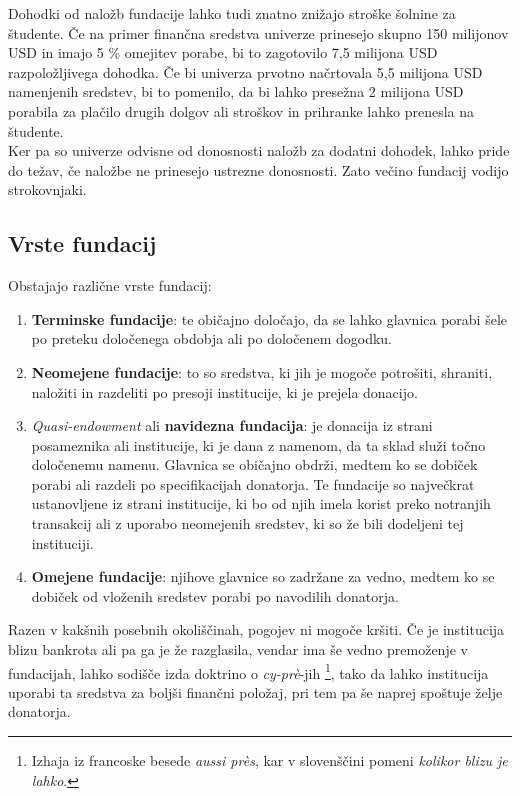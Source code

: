 \documentclass[12pt, a4paper]{article}
\begin{document}
Dohodki od naložb fundacije lahko tudi znatno znižajo stroške šolnine za študente. Če na primer finančna sredstva univerze prinesejo skupno 150 milijonov USD in imajo 5 \% omejitev porabe, bi to zagotovilo 7,5 milijona USD razpoložljivega dohodka. Če bi univerza prvotno načrtovala 5,5 milijona USD namenjenih sredstev, bi to pomenilo, da bi lahko presežna 2 milijona USD porabila za plačilo drugih dolgov ali stroškov in prihranke lahko prenesla na študente. \cite{Investopedia}\\

Ker pa so univerze odvisne od donosnosti naložb za dodatni dohodek, lahko pride do težav, če naložbe ne prinesejo ustrezne donosnosti. Zato večino fundacij vodijo strokovnjaki.\\


\subsection{Vrste fundacij}
Obstajajo različne vrste fundacij:
\begin{enumerate}
\item \textbf{Terminske fundacije}: te običajno določajo, da se lahko glavnica porabi šele po preteku določenega obdobja ali po določenem dogodku.
\item \textbf{Neomejene fundacije}: to so sredstva, ki jih je mogoče potrošiti, shraniti, naložiti in razdeliti po presoji institucije, ki je prejela donacijo.
\item \textit{Quasi-endowment} ali \textbf{navidezna fundacija}: je donacija iz strani posameznika ali institucije, ki je dana z namenom, da ta sklad služi točno določenemu namenu. Glavnica se običajno obdrži, medtem ko se dobiček porabi ali razdeli po specifikacijah donatorja. Te fundacije so največkrat ustanovljene iz strani institucije, ki bo od njih imela korist preko notranjih transakcij ali z uporabo neomejenih sredstev, ki so že bili dodeljeni tej instituciji.
\item \textbf{Omejene fundacije}: njihove glavnice so zadržane za vedno, medtem ko se dobiček od vloženih sredstev porabi po navodilih donatorja.
\end{enumerate}

Razen v kakšnih posebnih okoliščinah, pogojev ni mogoče kršiti. Če je institucija blizu bankrota ali pa ga je že razglasila, vendar ima še vedno premoženje v fundacijah, lahko sodišče izda doktrino o \textit{cy-prè}-jih \footnote{Izhaja iz francoske besede \textit{aussi près}, kar v slovenščini pomeni \textit{kolikor blizu je lahko}.}, tako da lahko institucija uporabi ta sredstva za boljši finančni položaj, pri tem pa še naprej spoštuje želje donatorja.
\end{document}
